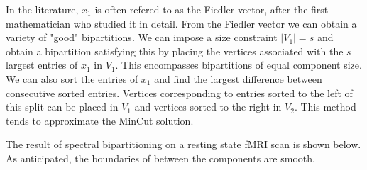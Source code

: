 In the literature, $x_1$ is often refered to as the Fiedler vector,
after the first mathematician who studied it in detail.
From the Fiedler vector we can obtain a variety of "good" bipartitions.
We can impose a size constraint $|V_1| = s$ and obtain a bipartition
satisfying this by placing the vertices associated with the $s$ largest
entries of $x_1$ in $V_1$. This encompasses bipartitions of equal
component size. We can also sort the entries of $x_1$ and find the
largest difference between consecutive sorted entries. Vertices
corresponding to entries sorted to the left of this split can be placed
in $V_1$ and vertices sorted to the right in $V_2$. This method tends to
approximate the MinCut solution.

The result of spectral bipartitioning on a resting state fMRI scan
is shown below. As anticipated, the boundaries of between the
components are smooth.

